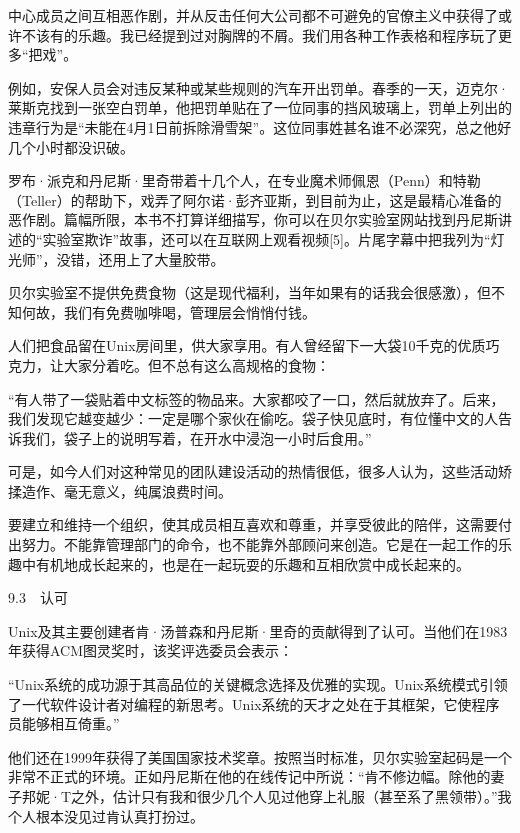 \documentclass[a4paper,12pt,UTF8,twoside]{ctexbook}
\begin{document}
中心成员之间互相恶作剧，并从反击任何大公司都不可避免的官僚主义中获得了或许不该有的乐趣。我已经提到过对胸牌的不屑。我们用各种工作表格和程序玩了更多“把戏”。

例如，安保人员会对违反某种或某些规则的汽车开出罚单。春季的一天，迈克尔·莱斯克找到一张空白罚单，他把罚单贴在了一位同事的挡风玻璃上，罚单上列出的违章行为是“未能在4月1日前拆除滑雪架”。这位同事姓甚名谁不必深究，总之他好几个小时都没识破。

罗布·派克和丹尼斯·里奇带着十几个人，在专业魔术师佩恩（Penn）和特勒（Teller）的帮助下，戏弄了阿尔诺·彭齐亚斯，到目前为止，这是最精心准备的恶作剧。篇幅所限，本书不打算详细描写，你可以在贝尔实验室网站找到丹尼斯讲述的“实验室欺诈”故事，还可以在互联网上观看视频[5]。片尾字幕中把我列为“灯光师”，没错，还用上了大量胶带。

贝尔实验室不提供免费食物（这是现代福利，当年如果有的话我会很感激），但不知何故，我们有免费咖啡喝，管理层会悄悄付钱。

人们把食品留在Unix房间里，供大家享用。有人曾经留下一大袋10千克的优质巧克力，让大家分着吃。但不总有这么高规格的食物：

“有人带了一袋贴着中文标签的物品来。大家都咬了一口，然后就放弃了。后来，我们发现它越变越少：一定是哪个家伙在偷吃。袋子快见底时，有位懂中文的人告诉我们，袋子上的说明写着，在开水中浸泡一小时后食用。”



可是，如今人们对这种常见的团队建设活动的热情很低，很多人认为，这些活动矫揉造作、毫无意义，纯属浪费时间。

要建立和维持一个组织，使其成员相互喜欢和尊重，并享受彼此的陪伴，这需要付出努力。不能靠管理部门的命令，也不能靠外部顾问来创造。它是在一起工作的乐趣中有机地成长起来的，也是在一起玩耍的乐趣和互相欣赏中成长起来的。





9.3　认可


Unix及其主要创建者肯·汤普森和丹尼斯·里奇的贡献得到了认可。当他们在1983年获得ACM图灵奖时，该奖评选委员会表示：

“Unix系统的成功源于其高品位的关键概念选择及优雅的实现。Unix系统模式引领了一代软件设计者对编程的新思考。Unix系统的天才之处在于其框架，它使程序员能够相互倚重。”



他们还在1999年获得了美国国家技术奖章。按照当时标准，贝尔实验室起码是一个非常不正式的环境。正如丹尼斯在他的在线传记中所说：“肯不修边幅。除他的妻子邦妮·T之外，估计只有我和很少几个人见过他穿上礼服（甚至系了黑领带）。”我个人根本没见过肯认真打扮过。
\end{document}
